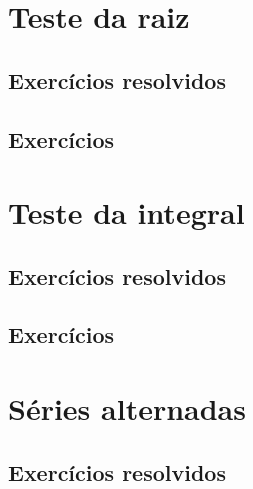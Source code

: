 \construirExer


\section{Teste da raiz}
\construirSec

\subsection*{Exercícios resolvidos}

\construirExeresol


\subsection*{Exercícios}

\construirExer


\section{Teste da integral}
\construirSec

\subsection*{Exercícios resolvidos}

\construirExeresol


\subsection*{Exercícios}

\construirExer


\section{Séries alternadas}
\construirSec

\subsection*{Exercícios resolvidos}

\construirExeresol


